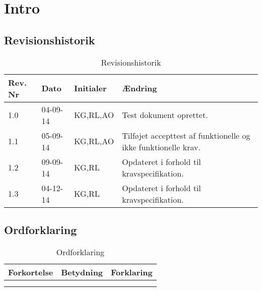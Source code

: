 \chapter{Intro}

\section{Revisionshistorik}

\begin{table}[H]
	\centering
		\begin{tabular}{|p{2 cm}|p{2 cm}|p{3 cm}|p{6 cm}|} 
		\hline
			\textbf{Rev. Nr} & \textbf{Dato}		& \textbf{Initialer} 	& \textbf{Ændring} \\ \hline
			1.0 	& 04-09-14	& KG,RL,AO		& Test dokument oprettet.	\\ \hline
			1.1 	& 05-09-14	& KG,RL,AO		& Tilføjet accepttest af funktionelle \newline og ikke funktionelle krav.\\ \hline
			1.2 	& 09-09-14	& KG,RL			& Opdateret i forhold til \newline kravspecifikation.	\\ \hline
			1.3 	& 04-12-14	& KG,RL			& Opdateret i forhold til \newline kravspecifikation.	\\ \hline
		\end{tabular}
	\caption{Revisionshistorik}
\end{table}

\section{Ordforklaring}


\begin{table}[H]
	\centering
		\begin{tabular}{|p{2.5cm}|p{4.5 cm}|p{6.5 cm}|}  
		\hline
			\textbf{Forkortelse} & \textbf{Betydning} & \textbf{Forklaring} \\ \hline
			& & \\ \hline
			& & \\ \hline
		\end{tabular}
	\caption{Ordforklaring}
\end{table}
